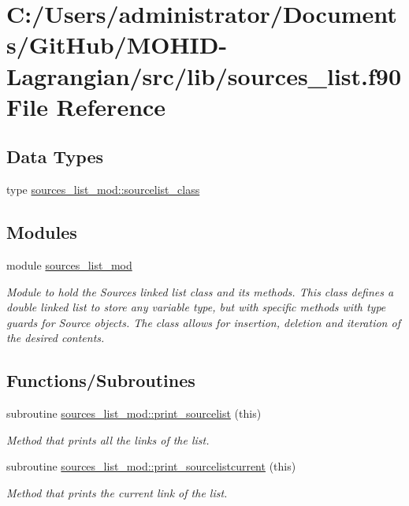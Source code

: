 \hypertarget{sources__list_8f90}{}\section{C\+:/\+Users/administrator/\+Documents/\+Git\+Hub/\+M\+O\+H\+I\+D-\/\+Lagrangian/src/lib/sources\+\_\+list.f90 File Reference}
\label{sources__list_8f90}
\subsection*{Data Types}
\begin{DoxyCompactItemize}
\item 
type \mbox{\hyperlink{structsources__list__mod_1_1sourcelist__class}{sources\+\_\+list\+\_\+mod\+::sourcelist\+\_\+class}}
\end{DoxyCompactItemize}
\subsection*{Modules}
\begin{DoxyCompactItemize}
\item 
module \mbox{\hyperlink{namespacesources__list__mod}{sources\+\_\+list\+\_\+mod}}
\begin{DoxyCompactList}\small\item\em Module to hold the Sources linked list class and its methods. This class defines a double linked list to store any variable type, but with specific methods with type guards for Source objects. The class allows for insertion, deletion and iteration of the desired contents. \end{DoxyCompactList}\end{DoxyCompactItemize}
\subsection*{Functions/\+Subroutines}
\begin{DoxyCompactItemize}
\item 
subroutine \mbox{\hyperlink{namespacesources__list__mod_ac9ab885c3cc6a38c8b12b694e40a11e1}{sources\+\_\+list\+\_\+mod\+::print\+\_\+sourcelist}} (this)
\begin{DoxyCompactList}\small\item\em Method that prints all the links of the list. \end{DoxyCompactList}\item 
subroutine \mbox{\hyperlink{namespacesources__list__mod_aad2008cc97f57cd85297d3f3d81fac39}{sources\+\_\+list\+\_\+mod\+::print\+\_\+sourcelistcurrent}} (this)
\begin{DoxyCompactList}\small\item\em Method that prints the current link of the list. \end{DoxyCompactList}\end{DoxyCompactItemize}
